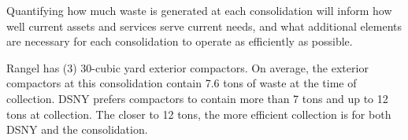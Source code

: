 
    Quantifying how much waste is generated at each consolidation will inform how well current assets and services serve current needs, and what additional elements are necessary for each consolidation to operate as efficiently as possible.
    
    Rangel has (3) 30-cubic yard exterior compactors. On average, the exterior compactors at this consolidation contain 7.6 tons of waste at the time of collection. DSNY prefers compactors to contain more than 7 tons and up to 12 tons at collection. The closer to 12 tons, the more efficient collection is for both DSNY and the consolidation.